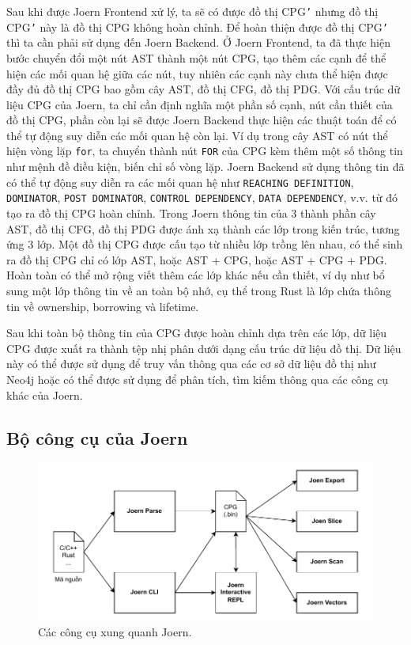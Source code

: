 Sau khi được Joern Frontend xử lý, ta sẽ có được đồ thị CPG\texttt{'} nhưng đồ thị CPG\texttt{'} này là đồ thị CPG không hoàn chỉnh.
Để hoàn thiện được đồ thị CPG\texttt{'} thì ta cần phải sử dụng đến Joern Backend.
Ở Joern Frontend, ta đã thực hiện bước chuyển đổi một nút AST thành một nút CPG, tạo thêm các cạnh để thể hiện các mối quan hệ giữa các nút, tuy nhiên các cạnh này chưa thể hiện được đầy đủ đồ thị CPG bao gồm cây AST, đồ thị CFG, đồ thị PDG.
Với cấu trúc dữ liệu CPG của Joern, ta chỉ cần định nghĩa một phần số cạnh, nút cần thiết của đồ thị CPG, phần còn lại sẽ được Joern Backend thực hiện các thuật toán để có thể tự động suy diễn các mối quan hệ còn lại.
Ví dụ trong cây AST có nút thể hiện vòng lặp \texttt{for}, ta chuyển thành nút \texttt{FOR} của CPG kèm thêm một số thông tin như mệnh đề điều kiện, biến chỉ số vòng lặp.
Joern Backend sử dụng thông tin đã có thể tự động suy diễn ra các mối quan hệ như \texttt{REACHING DEFINITION}, \texttt{DOMINATOR}, \texttt{POST DOMINATOR}, \texttt{CONTROL DEPENDENCY}, \texttt{DATA DEPENDENCY}, v.v.
từ đó tạo ra đồ thị CPG hoàn chỉnh.
Trong Joern thông tin của 3 thành phần cây AST, đồ thị CFG, đồ thị PDG được ánh xạ thành các lớp trong kiến trúc, tương ứng 3 lớp.
Một đồ thị CPG được cấu tạo từ nhiều lớp trồng lên nhau, có thể sinh ra đồ thị CPG chỉ có lớp AST, hoặc AST + CPG, hoặc AST + CPG + PDG.
Hoàn toàn có thể mở rộng viết thêm các lớp khác nếu cần thiết, ví dụ như bổ sung một lớp thông tin về an toàn bộ nhớ, cụ thể trong Rust là lớp chứa thông tin về ownership, borrowing và lifetime.

Sau khi toàn bộ thông tin của CPG được hoàn chỉnh dựa trên các lớp, dữ liệu CPG được xuất ra thành tệp nhị phân dưới dạng cấu trúc dữ liệu đồ thị.
Dữ liệu này có thể được sử dụng để truy vấn thông qua các cơ sở dữ liệu đồ thị như Neo4j \cite{miller2013graph} hoặc có thể được sử dụng để phân tích, tìm kiếm thông qua các công cụ khác của Joern.

\subsection{Bộ công cụ của Joern}

\begin{figure}[H]
  \includegraphics[width=1\columnwidth]{figures/c2/c2_joern_tools.drawio.pdf}
  \centering
  \caption{Các công cụ xung quanh Joern.}
  \label{img:c2_joern_tools}
\end{figure}

